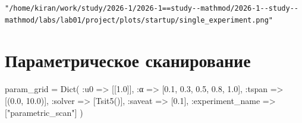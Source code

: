 \documentclass[
  russian,
  12pt,
  a4paper,
  DIV=11,
  numbers=noendperiod]{scrreprt}
\newenvironment{Shaded}{\begin{snugshade}}{\end{snugshade}}
\newcommand{\ConstantTok}[1]{\textcolor[rgb]{0.56,0.35,0.01}{#1}}
\newcommand{\FloatTok}[1]{\textcolor[rgb]{0.68,0.00,0.00}{#1}}
\newcommand{\FunctionTok}[1]{\textcolor[rgb]{0.28,0.35,0.67}{#1}}
\newcommand{\NormalTok}[1]{\textcolor[rgb]{0.00,0.23,0.31}{#1}}
\newcommand{\OperatorTok}[1]{\textcolor[rgb]{0.37,0.37,0.37}{#1}}
\newcommand{\SpecialCharTok}[1]{\textcolor[rgb]{0.37,0.37,0.37}{#1}}
\newcommand{\StringTok}[1]{\textcolor[rgb]{0.13,0.47,0.30}{#1}}
\begin{document}
\begin{Shaded}
\end{Shaded}

\begin{verbatim}
"/home/kiran/work/study/2026-1/2026-1==study--mathmod/2026-1--study--mathmod/labs/lab01/project/plots/startup/single_experiment.png"
\end{verbatim}

\section{Параметрическое
сканирование}\label{ux43fux430ux440ux430ux43cux435ux442ux440ux438ux447ux435ux441ux43aux43eux435-ux441ux43aux430ux43dux438ux440ux43eux432ux430ux43dux438ux435}

\begin{Shaded}
\begin{Highlighting}[]
\NormalTok{param\_grid }\OperatorTok{=} \FunctionTok{Dict}\NormalTok{(}
    \OperatorTok{:}\NormalTok{u0 }\OperatorTok{=\textgreater{}}\NormalTok{ [[}\FloatTok{1.0}\NormalTok{]],}
    \OperatorTok{:}\NormalTok{α }\OperatorTok{=\textgreater{}}\NormalTok{ [}\FloatTok{0.1}\NormalTok{, }\FloatTok{0.3}\NormalTok{, }\FloatTok{0.5}\NormalTok{, }\FloatTok{0.8}\NormalTok{, }\FloatTok{1.0}\NormalTok{],}
    \OperatorTok{:}\NormalTok{tspan }\OperatorTok{=\textgreater{}}\NormalTok{ [(}\FloatTok{0.0}\NormalTok{, }\FloatTok{10.0}\NormalTok{)],}
    \OperatorTok{:}\NormalTok{solver }\OperatorTok{=\textgreater{}}\NormalTok{ [}\FunctionTok{Tsit5}\NormalTok{()],}
    \OperatorTok{:}\NormalTok{saveat }\OperatorTok{=\textgreater{}}\NormalTok{ [}\FloatTok{0.1}\NormalTok{],}
    \OperatorTok{:}\NormalTok{experiment\_name }\OperatorTok{=\textgreater{}}\NormalTok{ [}\StringTok{"parametric\_scan"}\NormalTok{]}
\NormalTok{)}
\end{Highlighting}
\end{Shaded}
\end{document}
